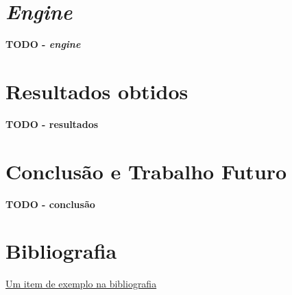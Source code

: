 \documentclass[12pt, a4paper]{article}
\begin{document}
\section{\emph{Engine}}

\textbf{\color{red} TODO - \emph{engine}}

\section{Resultados obtidos}

\textbf{\color{red} TODO - resultados}

\section{Conclusão e Trabalho Futuro}

\textbf{\color{red} TODO - conclusão}

\begingroup
\section{Bibliografia}
\renewcommand{\section}[2]{}

\begin{thebibliography}{9}
        \href{https://youtu.be/dQw4w9WgXcQ}{Um item de exemplo na bibliografia}
\end{thebibliography}
\endgroup
\end{document}
